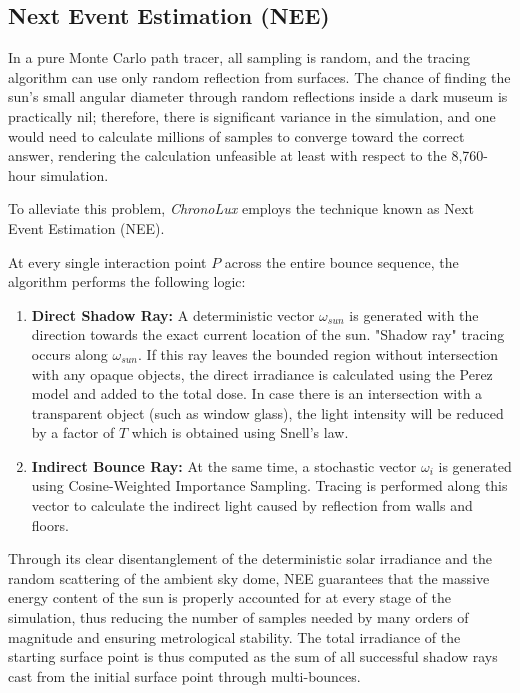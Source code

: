 \subsection{Next Event Estimation (NEE)}

In a pure Monte Carlo path tracer, all sampling is random, and the tracing algorithm can use only random reflection from surfaces. The chance of finding the sun's small angular diameter through random reflections inside a dark museum is practically nil; therefore, there is significant variance in the simulation, and one would need to calculate millions of samples to converge toward the correct answer, rendering the calculation unfeasible at least with respect to the 8,760-hour simulation.

To alleviate this problem, \textit{ChronoLux} employs the technique known as Next Event Estimation (NEE).

At every single interaction point $P$ across the entire bounce sequence, the algorithm performs the following logic:
\begin{enumerate}
    \item \textbf{Direct Shadow Ray:} A deterministic vector $\omega_{sun}$ is generated with the direction towards the exact current location of the sun. "Shadow ray" tracing occurs along $\omega_{sun}$. If this ray leaves the bounded region without intersection with any opaque objects, the direct irradiance is calculated using the Perez model and added to the total dose. In case there is an intersection with a transparent object (such as window glass), the light intensity will be reduced by a factor of $T$ which is obtained using Snell's law.
    \item \textbf{Indirect Bounce Ray:} At the same time, a stochastic vector $\omega_i$ is generated using Cosine-Weighted Importance Sampling. Tracing is performed along this vector to calculate the indirect light caused by reflection from walls and floors.
\end{enumerate}

Through its clear disentanglement of the deterministic solar irradiance and the random scattering of the ambient sky dome, NEE guarantees that the massive energy content of the sun is properly accounted for at every stage of the simulation, thus reducing the number of samples needed by many orders of magnitude and ensuring metrological stability. The total irradiance of the starting surface point is thus computed as the sum of all successful shadow rays cast from the initial surface point through multi-bounces.

